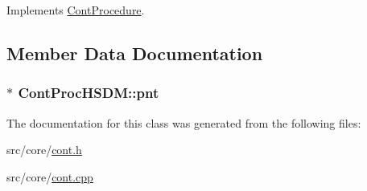 Implements \hyperlink{a00067_a7f7adefe250a00b3778669ef649f03ac}{Cont\-Procedure}.



\subsection{Member Data Documentation}
\hypertarget{a00075_a772b7e6f6be9a1983232f3a43ca75f75}{
\subsubsection[{pnt}]{$\ast$ Cont\-Proc\-H\-S\-D\-M\-::pnt\hspace{0.3cm}{\ttfamily [private]}}}\label{a00075_a772b7e6f6be9a1983232f3a43ca75f75}


The documentation for this class was generated from the following files\-:\begin{DoxyCompactItemize}
\item 
src/core/\hyperlink{a00218}{cont.\-h}\item 
src/core/\hyperlink{a00217}{cont.\-cpp}\end{DoxyCompactItemize}
